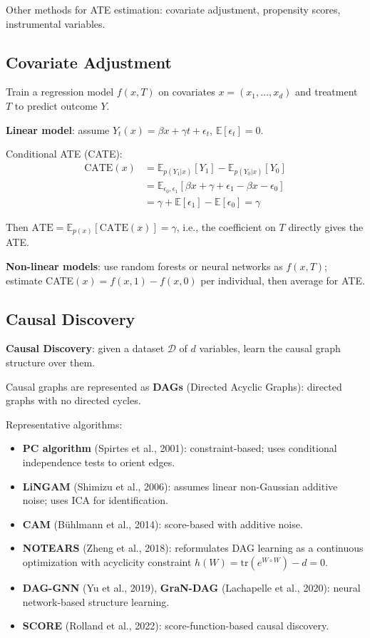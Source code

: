 \documentclass[UTF8]{ctexart}
\begin{document}
Other methods for ATE estimation: covariate adjustment, propensity scores, instrumental variables.

\subsection{Covariate Adjustment}

Train a regression model $f(x, T)$ on covariates $x = (x_1, \ldots, x_d)$ and treatment $T$ to predict outcome $Y$.

\textbf{Linear model}: assume $Y_t(x) = \beta x + \gamma t + \epsilon_t$, $\mathbb{E}[\epsilon_t] = 0$.

Conditional ATE (CATE):
\begin{align*}
    \text{CATE}(x) &= \mathbb{E}_{p(Y_1|x)}[Y_1] - \mathbb{E}_{p(Y_0|x)}[Y_0] \\
                   &= \mathbb{E}_{\epsilon_0,\epsilon_1}[\beta x + \gamma + \epsilon_1 - \beta x - \epsilon_0] \\
                   &= \gamma + \mathbb{E}[\epsilon_1] - \mathbb{E}[\epsilon_0] = \gamma
\end{align*}

Then $\text{ATE} = \mathbb{E}_{p(x)}[\text{CATE}(x)] = \gamma$, i.e., the coefficient on $T$ directly gives the ATE.

\textbf{Non-linear models}: use random forests or neural networks as $f(x,T)$; estimate CATE$(x) = f(x,1) - f(x,0)$ per individual, then average for ATE.

\subsection{Causal Discovery}

\textbf{Causal Discovery}: given a dataset $\mathcal{D}$ of $d$ variables, learn the causal graph structure over them.

Causal graphs are represented as \textbf{DAGs} (Directed Acyclic Graphs): directed graphs with no directed cycles.

Representative algorithms:
\begin{itemize}
    \item \textbf{PC algorithm} (Spirtes et al., 2001): constraint-based; uses conditional independence tests to orient edges.
    \item \textbf{LiNGAM} (Shimizu et al., 2006): assumes linear non-Gaussian additive noise; uses ICA for identification.
    \item \textbf{CAM} (Bühlmann et al., 2014): score-based with additive noise.
    \item \textbf{NOTEARS} (Zheng et al., 2018): reformulates DAG learning as a continuous optimization with acyclicity constraint $h(W) = \mathrm{tr}(e^{W \circ W}) - d = 0$.
    \item \textbf{DAG-GNN} (Yu et al., 2019), \textbf{GraN-DAG} (Lachapelle et al., 2020): neural network-based structure learning.
    \item \textbf{SCORE} (Rolland et al., 2022): score-function-based causal discovery.
\end{itemize}
\end{document}
